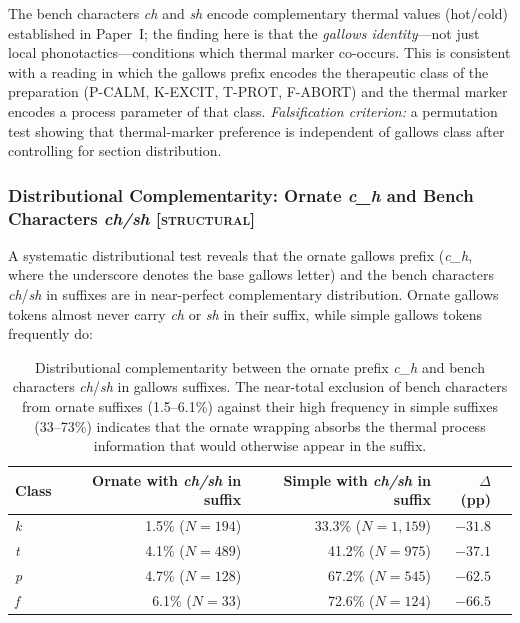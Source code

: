 \documentclass[11pt,a4paper]{article}
\newcommand{\structural}{\textsc{[structural]}}
\begin{document}
The bench characters \textit{ch} and \textit{sh} encode complementary thermal values (hot/cold) established in Paper~I; the finding here is that the \emph{gallows identity}---not just local phonotactics---conditions which thermal marker co-occurs. This is consistent with a reading in which the gallows prefix encodes the therapeutic class of the preparation (P-CALM, K-EXCIT, T-PROT, F-ABORT) and the thermal marker encodes a process parameter of that class. \textit{Falsification criterion:} a permutation test showing that thermal-marker preference is independent of gallows class after controlling for section distribution.

\subsubsection{Distributional Complementarity: Ornate \textit{c\_h} and Bench Characters \textit{ch/sh} \structural{}}

A systematic distributional test reveals that the ornate gallows prefix (\textit{c\_h}, where the underscore denotes the base gallows letter) and the bench characters \textit{ch}/\textit{sh} in suffixes are in near-perfect complementary distribution. Ornate gallows tokens almost never carry \textit{ch} or \textit{sh} in their suffix, while simple gallows tokens frequently do:

\begin{table}[H]
\centering
\begin{tabular}{lrrrr}
\toprule
Class & Ornate with \textit{ch/sh} in suffix & Simple with \textit{ch/sh} in suffix & $\Delta$ (pp) \\
\midrule
\textit{k} & 1.5\% ($N=194$) & 33.3\% ($N=1{,}159$) & $-31.8$ \\
\textit{t} & 4.1\% ($N=489$) & 41.2\% ($N=975$) & $-37.1$ \\
\textit{p} & 4.7\% ($N=128$) & 67.2\% ($N=545$) & $-62.5$ \\
\textit{f} & 6.1\% ($N=33$) & 72.6\% ($N=124$) & $-66.5$ \\
\bottomrule
\end{tabular}
\caption{Distributional complementarity between the ornate prefix \textit{c\_h} and bench characters \textit{ch}/\textit{sh} in gallows suffixes. The near-total exclusion of bench characters from ornate suffixes (1.5--6.1\%) against their high frequency in simple suffixes (33--73\%) indicates that the ornate wrapping absorbs the thermal process information that would otherwise appear in the suffix.}
\end{table}
\end{document}
